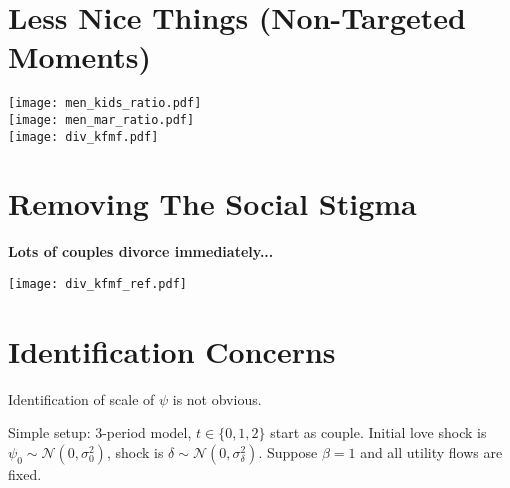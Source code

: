 \documentclass[12pt,letter]{article}
\begin{document}
\newpage

\section{Less Nice Things (Non-Targeted Moments)}
\begin{center}
\texttt{[image: men\_kids\_ratio.pdf]} \\
\texttt{[image: men\_mar\_ratio.pdf]} \\
\texttt{[image: div\_kfmf.pdf]} 
\end{center}


\newpage
\section{Removing The Social Stigma}
\begin{center}
\textbf{Lots of couples divorce immediately...}

\texttt{[image: div\_kfmf\_ref.pdf]} 
\end{center}


\newpage

\section{Identification Concerns}
Identification of scale of $\psi$ is not obvious.

Simple setup: 3-period model, $t \in \{0,1,2\}$ start as couple. Initial love shock is $\psi_0 \sim \mathcal{N}(0,\sigma^2_0)$, shock is $\delta \sim \mathcal{N}(0,\sigma^2_\delta)$.  Suppose $\beta = 1$ and all utility flows are fixed.
\end{document}
